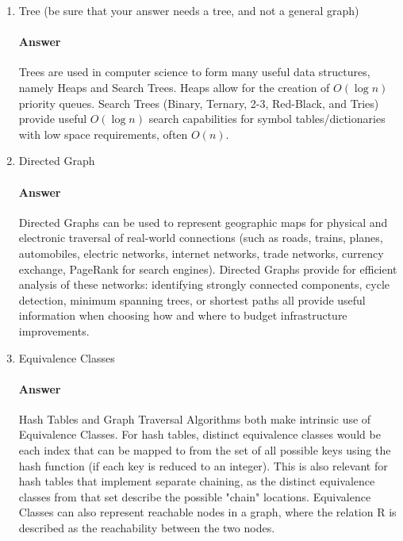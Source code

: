 \documentclass{article}
\begin{document}
\begin{enumerate}

    \item Tree (be sure that your answer needs a tree, and not a general graph)

        \paragraph{Answer}

        Trees are used in computer science to form many useful data structures, namely Heaps and Search Trees. Heaps allow for the creation of $O(\log n)$ priority queues. Search Trees (Binary, Ternary, 2-3, Red-Black, and Tries) provide useful $O(\log n)$ search capabilities for symbol tables/dictionaries with low space requirements, often $O(n)$.

    \item Directed Graph

        \paragraph{Answer}

        Directed Graphs can be used to represent geographic maps for physical and electronic traversal of real-world connections (such as roads, trains, planes, automobiles, electric networks, internet networks, trade networks, currency exchange, PageRank for search engines). Directed Graphs provide for efficient analysis of these networks: identifying strongly connected components, cycle detection, minimum spanning trees, or shortest paths all provide useful information when choosing how and where to budget infrastructure improvements.

    \item Equivalence Classes

        \paragraph{Answer}

    
        Hash Tables and Graph Traversal Algorithms both make intrinsic use of Equivalence Classes. For hash tables, distinct equivalence classes would be each index that can be mapped to from the set of all possible keys using the hash function (if each key is reduced to an integer). This is also relevant for hash tables that implement separate chaining, as the distinct equivalence classes from that set describe the possible "chain" locations. Equivalence Classes can also represent reachable nodes in a graph, where the relation R is described as the reachability between the two nodes.


\end{enumerate}
\end{document}
